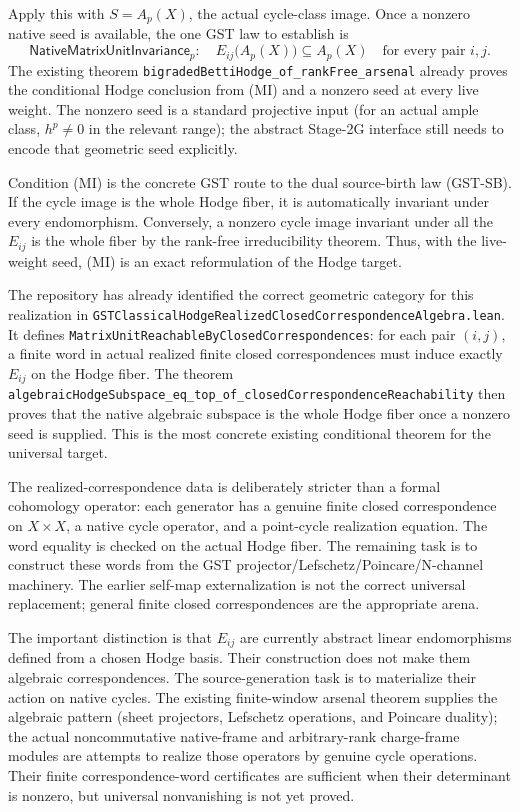 Apply this with \(S=A_p(X)\), the actual cycle-class image. Once a nonzero native seed is available, the one GST law to establish is
\[
\boxed{
\mathsf{NativeMatrixUnitInvariance}_p:
\quad
E_{ij}\bigl(A_p(X)\bigr)\subseteq A_p(X)
\quad\text{for every pair }i,j.
}
\tag{MI}
\]
The existing theorem \texttt{bigradedBettiHodge\_of\_rankFree\_arsenal} already proves the conditional Hodge conclusion from (MI) and a nonzero seed at every live weight. The nonzero seed is a standard projective input (for an actual ample class, \(h^p\ne0\) in the relevant range); the abstract Stage-2G interface still needs to encode that geometric seed explicitly.

Condition (MI) is the concrete GST route to the dual source-birth law (GST-SB). If the cycle image is the whole Hodge fiber, it is automatically invariant under every endomorphism. Conversely, a nonzero cycle image invariant under all the \(E_{ij}\) is the whole fiber by the rank-free irreducibility theorem. Thus, with the live-weight seed, (MI) is an exact reformulation of the Hodge target.

The repository has already identified the correct geometric category for this realization in \texttt{GSTClassicalHodgeRealizedClosedCorrespondenceAlgebra.lean}. It defines \texttt{MatrixUnitReachableByClosedCorrespondences}: for each pair \((i,j)\), a finite word in actual realized finite closed correspondences must induce exactly \(E_{ij}\) on the Hodge fiber. The theorem \texttt{algebraicHodgeSubspace\_eq\_top\_of\_closedCorrespondenceReachability} then proves that the native algebraic subspace is the whole Hodge fiber once a nonzero seed is supplied. This is the most concrete existing conditional theorem for the universal target.

The realized-correspondence data is deliberately stricter than a formal cohomology operator: each generator has a genuine finite closed correspondence on \(X\times X\), a native cycle operator, and a point-cycle realization equation. The word equality is checked on the actual Hodge fiber. The remaining task is to construct these words from the GST projector/Lefschetz/Poincare/N-channel machinery. The earlier self-map externalization is not the correct universal replacement; general finite closed correspondences are the appropriate arena.

The important distinction is that \(E_{ij}\) are currently abstract linear endomorphisms defined from a chosen Hodge basis. Their construction does not make them algebraic correspondences. The source-generation task is to materialize their action on native cycles. The existing finite-window arsenal theorem supplies the algebraic pattern (sheet projectors, Lefschetz operations, and Poincare duality); the actual noncommutative native-frame and arbitrary-rank charge-frame modules are attempts to realize those operators by genuine cycle operations. Their finite correspondence-word certificates are sufficient when their determinant is nonzero, but universal nonvanishing is not yet proved.

